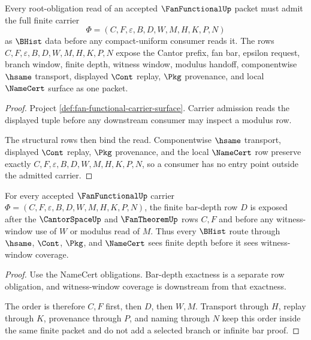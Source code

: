 \begin{theorem}
\label{thm:fan-functional-root-carrier-admission}
Every root-obligation read of an accepted $\FanFunctionalUp$ packet must admit the full finite carrier
$$
\Phi=(C,F,\varepsilon,B,D,W,M,H,K,P,N)
$$
as $\BHist$ data before any compact-uniform consumer reads it. The rows $C,F,\varepsilon,B,D,W,M,H,K,P,N$ expose the Cantor prefix, fan bar, epsilon request, branch window, finite depth, witness window, modulus handoff, componentwise $\hsame$ transport, displayed $\Cont$ replay, $\Pkg$ provenance, and local $\NameCert$ surface as one packet.
\end{theorem}
\begin{proof}
Project \autoref{def:fan-functional-carrier-surface}. Carrier admission reads the displayed tuple before any downstream consumer may inspect a modulus row.

The structural rows then bind the read. Componentwise $\hsame$ transport, displayed $\Cont$ replay, $\Pkg$ provenance, and the local $\NameCert$ row preserve exactly $C,F,\varepsilon,B,D,W,M,H,K,P,N$, so a consumer has no entry point outside the admitted carrier.
\end{proof}

\begin{theorem}
\label{thm:fan-functional-root-finite-bar-depth}
For every accepted $\FanFunctionalUp$ carrier $\Phi=(C,F,\varepsilon,B,D,W,M,H,K,P,N)$, the finite bar-depth row $D$ is exposed after the $\CantorSpaceUp$ and $\FanTheoremUp$ rows $C,F$ and before any witness-window use of $W$ or modulus read of $M$. Thus every $\BHist$ route through $\hsame$, $\Cont$, $\Pkg$, and $\NameCert$ sees finite depth before it sees witness-window coverage.
\end{theorem}
\begin{proof}
Use the NameCert obligations. Bar-depth exactness is a separate row obligation, and witness-window coverage is downstream from that exactness.

The order is therefore $C,F$ first, then $D$, then $W,M$. Transport through $H$, replay through $K$, provenance through $P$, and naming through $N$ keep this order inside the same finite packet and do not add a selected branch or infinite bar proof.
\end{proof}

